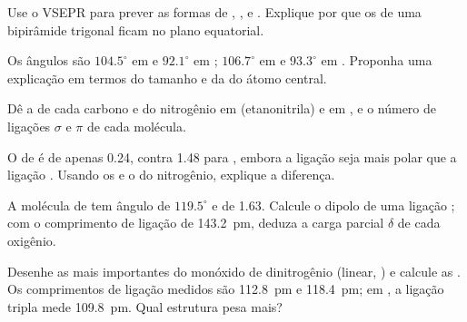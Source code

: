 \begin{exercise}[$\star\star$]\label{exo:b1:lewis-resonance-vsepr:7}
Use o VSEPR para prever as formas de , ,  e
. Explique por que os  de uma bipirâmide
trigonal ficam no plano equatorial.
\end{exercise}

\begin{exercise}[$\star\star$]\label{exo:b1:lewis-resonance-vsepr:8}
Os ângulos  são $104.5^\circ$ em  e $92.1^\circ$ em
; $106.7^\circ$ em  e $93.3^\circ$ em . Proponha
uma explicação em termos do tamanho e da  do átomo
central.
\end{exercise}

\begin{exercise}[$\star\star$]\label{exo:b1:lewis-resonance-vsepr:9}
Dê a  de cada carbono e do nitrogênio em
 (etanonitrila) e em , e o número de
ligações $\sigma$ e $\pi$ de cada molécula.
\end{exercise}

\begin{exercise}[$\star\star\star$]\label{exo:b1:lewis-resonance-vsepr:10}
O  de  é de apenas \qty{0.24}{\debye}, contra
\qty{1.48}{\debye} para , embora a ligação  seja mais
polar que a ligação . Usando os  e o  do nitrogênio, explique a diferença.
\end{exercise}

\begin{exercise}[$\star\star\star$]\label{exo:b1:lewis-resonance-vsepr:11}
A molécula de  tem ângulo de $119.5^\circ$ e 
de \qty{1.63}{\debye}. Calcule o dipolo de uma ligação ; com o
comprimento de ligação de \qty{143.2}{pm}, deduza a carga parcial $\delta$
de cada oxigênio.
\end{exercise}

\begin{exercise}[$\star\star\star$]\label{exo:b1:lewis-resonance-vsepr:12}
Desenhe as  mais importantes do monóxido de
dinitrogênio  (linear, ) e calcule as .
Os comprimentos de ligação medidos são  \qty{112.8}{pm} e
 \qty{118.4}{pm}; em , a ligação tripla mede
\qty{109.8}{pm}. Qual estrutura pesa mais?
\end{exercise}

